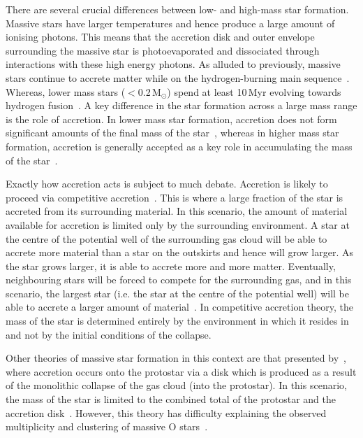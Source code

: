 There are several crucial differences between low- and high-mass star formation.\footnotemark~
Massive stars have larger temperatures and hence produce a large amount of ionising photons.
This means that the accretion disk and outer envelope surrounding the massive star is photoevaporated and dissociated through interactions with these high energy photons.
As alluded to previously, massive stars continue to accrete matter while on the hydrogen-burning main sequence~\citep{Zinnecker07}.
Whereas, lower mass stars ($<$0.2\,M$_{\odot}$) spend at least 10\,Myr evolving towards hydrogen fusion~\citep{Luhman12}.
A key difference in the star formation across a large mass range is the role of accretion.
In lower mass star formation, accretion does not form significant amounts of the final mass of the star~\citep{Bonnell08}, whereas in higher mass star formation, accretion is generally accepted as a key role in accumulating the mass of the star~\citep{Kraus10}.


Exactly how accretion acts is subject to much debate.
Accretion is likely to proceed via competitive accretion~\citep{Bonnell01}.
This is where a large fraction of the star is accreted from its surrounding material.
In this scenario, the amount of material available for accretion is limited only by the surrounding environment.
A star at the centre of the potential well of the surrounding gas cloud will be able to accrete more material than a star on the outskirts and hence will grow larger.
As the star grows larger, it is able to accrete more and more matter.
Eventually, neighbouring stars will be forced to compete for the surrounding gas, and in this scenario, the largest star (i.e. the star at the centre of the potential well) will be able to accrete a larger amount of material~\citep[for a useful economical analogy -- the rich get richer --, see Section 4.2 of][]{Zinnecker07}.
In competitive accretion theory, the mass of the star is determined entirely by the environment in which it resides in and not by the initial conditions of the collapse.

Other theories of massive star formation in this context are that presented by~\cite{Yorke02}, where accretion occurs onto the protostar via a disk which is produced as a result of the monolithic collapse of the gas cloud (into the protostar).
In this scenario, the mass of the star is limited to the combined total of the protostar and the accretion disk~\citep{Zinnecker07}.
However, this theory has difficulty explaining the observed multiplicity and clustering of massive O stars~\citep{Zinnecker07, Sana12, 2012ARA&A..50..531K}.

